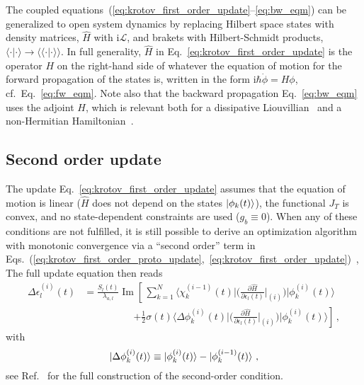 \documentclass[submission, Phys]{SciPost}
\newcommand{\Op}[1]{\hat{#1}}
\newcommand{\Liouville}[0]{\mathcal{L}}
\renewcommand{\Im}[0]{\operatorname{Im}}
\begin{document}
The coupled equations~(\ref{eq:krotov_first_order_update}--\ref{eq:bw_eqm}) can
be generalized to open system dynamics by replacing Hilbert space states with
density matrices, \(\Op{H}\) with \(\mathrm{i} \Liouville\), and brakets with
Hilbert-Schmidt products, \(\langle  \cdot \vert \cdot \rangle \rightarrow
\langle\!\langle \cdot  \vert \cdot \rangle\!\rangle\). In full generality,
$\Op{H}$ in Eq.~\eqref{eq:krotov_first_order_update} is the operator $H$ on the
right-hand side of whatever the equation of motion for the forward propagation
of the states is, written in the form $\mathrm{i} \hbar \dot\phi = H \phi$,
cf.~Eq.~\eqref{eq:fw_eqm}.
Note also that the backward propagation Eq.~\eqref{eq:bw_eqm} uses the adjoint
$H$, which is relevant both for a dissipative
Liouvillian~\cite{BartanaJCP93,OhtsukiJCP99,GoerzNJP2014} and a non-Hermitian
Hamiltonian~\cite{MullerQIP11,GoerzQST2018}.

\subsection{Second order update}%
\label{apx:krotov_update_second_order}

The update Eq.~\eqref{eq:krotov_first_order_update} assumes that the equation of
motion is linear (\(\Op{H}\) does not depend on the states \(\ket{\phi_k(t)}\)),
the functional \(J_T\) is convex, and no state-dependent constraints are used
(\(g_b\equiv 0\)). When any of these conditions are not fulfilled, it is still
possible to derive an optimization algorithm with monotonic convergence via a
``second order'' term in
Eqs.~(\ref{eq:krotov_first_order_proto_update},~\ref{eq:krotov_first_order_update})~\cite{KonnovARC99,ReichJCP12},
The full update equation then reads
\begin{equation}%
  \label{eq:krotov_second_order_update}
  \begin{split}
  \Delta\epsilon^{(i)}_l(t)
    &= \frac{S_l(t)}{\lambda_{a,l}} \Im \left[\,
        \sum_{k=1}^{N} \Bigg\langle \chi_k^{(i-1)}(t) \Bigg\vert \Bigg(
        \frac{\partial \Op{H}}{\partial \epsilon_l(t)}
        \bigg\vert_{(i)} \Bigg)
        \Bigg\vert \phi_k^{(i)}(t) \Bigg\rangle
      \right. \\ & \qquad \qquad \quad \left.
        + \frac{1}{2} \sigma(t)
        \Bigg\langle \Delta\phi_k^{(i)}(t) \Bigg\vert \Bigg(
        \frac{\partial \Op{H}}{\partial \epsilon_l(t)}
        \bigg\vert_{(i)} \Bigg)
        \Bigg\vert \phi_k^{(i)}(t) \Bigg\rangle
      \right]\,,
  \end{split}
\end{equation}
with
\begin{equation}
  \ket{\Delta \phi_k^{(i)}(t)}
  \equiv \ket{\phi_k^{(i)}(t)} - \ket{\phi_k^{(i-1)}(t)}\,,
\end{equation}
see Ref.~\cite{ReichJCP12} for the full construction of the second-order
condition.
\end{document}
